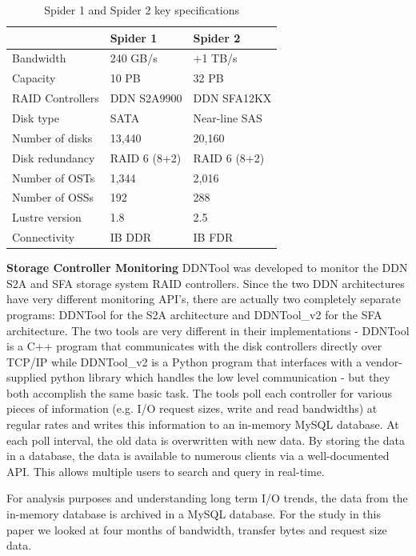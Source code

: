 \begin{table}
\begin{center}
\begin{tabular}{l||l|l}
 & Spider 1 & Spider 2\\
\hline
Bandwidth & 240 GB/s & +1 TB/s \\
Capacity & 10 PB & 32 PB \\
RAID Controllers & DDN S2A9900 & DDN SFA12KX\\
Disk type & SATA & Near-line SAS\\
Number of disks & 13,440 & 20,160\\
Disk redundancy & RAID 6 (8+2) & RAID 6 (8+2)\\
Number of OSTs & 1,344 & 2,016\\
Number of OSSs & 192 & 288\\
Lustre version & 1.8 & 2.5\\
Connectivity & IB DDR & IB FDR\\ 
\end{tabular}
\end{center}
\caption{Spider 1 and Spider 2 key specifications}
\label{table:spider12}
\end{table}


\textbf{Storage Controller Monitoring} 
DDNTool \cite{ddntool10:ross} was developed to monitor the DDN S2A and SFA
storage system RAID controllers. Since the two DDN architectures have very
different monitoring API's, there are actually two completely separate
programs:  DDNTool for the S2A architecture and DDNTool\_v2 for the SFA
architecture. The two tools are very different in their implementations -
DDNTool is a C++ program that communicates with the disk controllers directly
over TCP/IP while DDNTool\_v2 is a Python program that interfaces with a
vendor-supplied python library which handles the low level communication - but
they both accomplish the same basic task. The tools poll each controller for
various pieces of information (e.g. I/O request sizes, write and read
bandwidths) at regular rates and writes this information to an in-memory MySQL database.
At each poll interval, the old data is overwritten with new data. By storing the data in
a database, the data is available to numerous clients via a
well-documented API. This allows multiple users to search and query in
real-time. 

For analysis purposes and understanding long term I/O trends, the data from the in-memory database is
archived in a MySQL database. For the study in this paper we looked at four months of bandwidth, transfer bytes and request size data.    

